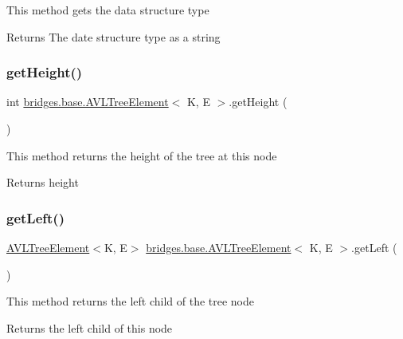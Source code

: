 This method gets the data structure type

\begin{DoxyReturn}{Returns}
The date structure type as a string 
\end{DoxyReturn}
\hypertarget{classbridges_1_1base_1_1_a_v_l_tree_element_a52fe2886334c841547d238db69022697}{}\label{classbridges_1_1base_1_1_a_v_l_tree_element_a52fe2886334c841547d238db69022697} 
\subsubsection{\texorpdfstring{get\+Height()}{getHeight()}}
{\footnotesize\ttfamily int \hyperlink{classbridges_1_1base_1_1_a_v_l_tree_element}{bridges.\+base.\+A\+V\+L\+Tree\+Element}$<$ K, E $>$.get\+Height (\begin{DoxyParamCaption}{ }\end{DoxyParamCaption})}

This method returns the height of the tree at this node

\begin{DoxyReturn}{Returns}
height 
\end{DoxyReturn}
\hypertarget{classbridges_1_1base_1_1_a_v_l_tree_element_a86f1329b19d2886ba7bf713e3844ecd6}{}\label{classbridges_1_1base_1_1_a_v_l_tree_element_a86f1329b19d2886ba7bf713e3844ecd6} 
\subsubsection{\texorpdfstring{get\+Left()}{getLeft()}}
{\footnotesize\ttfamily \hyperlink{classbridges_1_1base_1_1_a_v_l_tree_element}{A\+V\+L\+Tree\+Element}$<$K, E$>$ \hyperlink{classbridges_1_1base_1_1_a_v_l_tree_element}{bridges.\+base.\+A\+V\+L\+Tree\+Element}$<$ K, E $>$.get\+Left (\begin{DoxyParamCaption}{ }\end{DoxyParamCaption})}

This method returns the left child of the tree node

\begin{DoxyReturn}{Returns}
the left child of this node 
\end{DoxyReturn}
\hypertarget{classbridges_1_1base_1_1_a_v_l_tree_element_aab93418ac19605f2c7c57aa38d110921}{}\label{classbridges_1_1base_1_1_a_v_l_tree_element_aab93418ac19605f2c7c57aa38d110921} 
